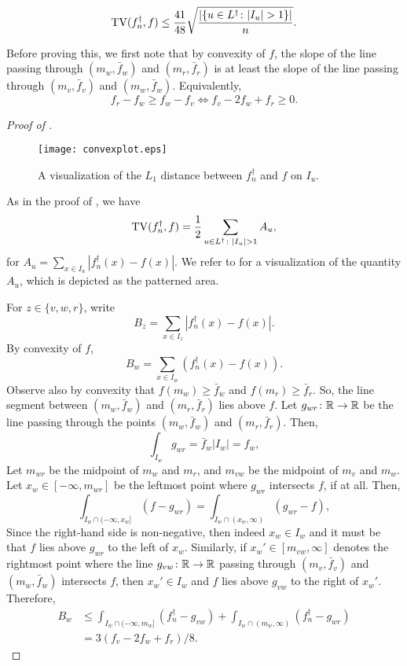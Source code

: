 \begin{prop}
  \[
    \operatorname{TV}(f_n^\dagger, f) \le \frac{41}{48} \sqrt{\frac{|\{u \in L^\dagger \colon |I_u| > 1\}|}{n} } .
  \]
\end{prop}
Before proving this, we first note that by convexity of $f$, the slope
of the line passing through $(m_w, \bar{f}_w)$ and $(m_r, \bar{f}_r)$
is at least the slope of the line passing through $(m_v, \bar{f}_v)$
and $(m_w, \bar{f}_w)$. Equivalently,
\[
  f_r - f_w \ge f_w - f_v \iff f_v - 2 f_w + f_r \ge 0 .
\]
\begin{proof}[Proof of ]
  \begin{figure} 
    \centering
    \texttt{[image: convexplot.eps]}
    \caption{A visualization of the $L_1$ distance between $f^\dagger_n$ and
      $f$ on $I_u$.}
  \end{figure}  
  As in the proof of , we have
  \[
    \operatorname{TV}(f_n^\dagger, f) = \frac{1}{2} \sum_{u \in L^\dagger \colon |I_u| > 1} A_u ,
  \]
  for $A_u = \sum_{x \in I_u} |f_n^\dagger(x) - f(x)|$. We refer to
   for a visualization of the quantity $A_u$, which
  is depicted as the patterned area.


  For $z \in \{v, w, r\}$, write
  \[
    B_z = \sum_{x \in I_z} |f^\dagger_n(x) - f(x)| .
  \]
  By convexity of $f$,
  \[
    B_w = \sum_{x \in I_w} (f^\dagger_n(x) - f(x)) .
  \]
  Observe also by convexity that $f(m_w) \ge \bar{f}_w$ and
  $f(m_r) \ge \bar{f}_r$. So, the line segment between
  $(m_w, \bar{f}_w)$ and $(m_r, \bar{f}_r)$ lies above $f$. Let
  $g_{wr} \colon \mathbb{R} \to \mathbb{R}$ be the line passing through the points
  $(m_w, \bar{f}_w)$ and $(m_r, \bar{f}_r)$. Then,
  \[
    \int_{I_w} g_{wr} = \bar{f}_w |I_w| = f_w ,
  \]
  Let $m_{wr}$ be the midpoint of $m_w$ and $m_r$, and $m_{vw}$ be the
  midpoint of $m_v$ and $m_w$. Let $x_w \in [-\infty, m_{wr}]$ be the
  leftmost point where $g_{wr}$ intersects $f$, if at all. Then,
  \[
    \int_{I_w \cap (-\infty, x_w]} (f - g_{wr}) = \int_{I_w \cap (x_w, \infty)} (g_{wr} - f),
  \]
  Since the right-hand side is non-negative, then indeed $x_w \in I_w$
  and it must be that $f$ lies above $g_{wr}$ to the left of
  $x_w$. Similarly, if $x_w' \in [m_{vw}, \infty]$ denotes the
  rightmost point where the line $g_{vw} \colon \mathbb{R} \to \mathbb{R}$ passing
  through $(m_v, \bar{f}_v)$ and $(m_w, \bar{f}_w)$ intersects $f$,
  then $x_w' \in I_w$ and $f$ lies above $g_{vw}$ to the right of
  $x_w'$. Therefore,
  \begin{align*}
    B_w &\le \int_{I_w \cap (-\infty, m_w]} (f^\dagger_n - g_{vw}) + \int_{I_w \cap (m_w, \infty)} (f^\dagger_n - g_{wr}) \\
        &= 3(f_v - 2 f_w + f_r)/8 .
  \end{align*}


\end{proof}
